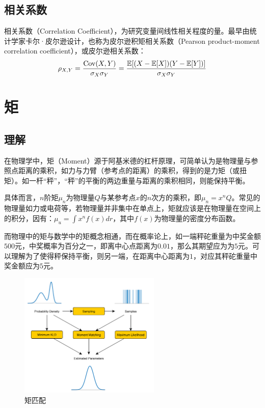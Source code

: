 \documentclass[11pt]{article}
\begin{document}
\subsection{相关系数}

相关系数（Correlation Coefficient），为研究变量间线性相关程度的量。最早由统计学家卡尔·皮尔逊设计，也称为皮尔逊积矩相关系数（Pearson product-moment correlation coefficient），或皮尔逊相关系数：
\begin{equation*}
    \rho_{X,Y} = \frac{\operatorname{Cov}(X,Y)}{\sigma_X\sigma_Y}
    = \frac{\mathbb{E}[(X-\mathbb{E}[X])(Y-\mathbb{E}[Y])]}{\sigma_X\sigma_Y}
\end{equation*}

\section{矩}

\subsection{理解}

在物理学中，矩（Moment）源于阿基米德的杠杆原理，可简单认为是物理量与参照点距离的乘积，如力与力臂（参考点的距离）的乘积，得到的是力矩（或扭矩）。如一杆“秤”，“秤”的平衡的两边重量与距离的乘积相同，则能保持平衡。

具体而言，$n$阶矩$\mu_n$为物理量$Q$与某参考点$x$的$n$次方的乘积，即$\mu_n = x^n Q$。常见的物理量如力或电荷等，若物理量并非集中在单点上，矩就应该是在物理量在空间上的积分，因有：$\mu_u = \int x^n f(x) dr$，其中$f(x)$为物理量的密度分布函数。

而物理中的矩与数学中的矩概念相通，而在概率论上，如一端秤砣重量为中奖金额$500$元，中奖概率为百分之一，即离中心点距离为$0.01$，那么其期望应为为$5$元。可以理解为了使得秤保持平衡，则另一端，在距离中心距离为$1$，对应其秤砣重量中奖金额应为$5$元。

\begin{figure}[H]
    \centering
    \includegraphics[width=0.6\textwidth]{fig/moment-matching.png}
    \caption{矩匹配}
    \label{fig:moment-match}
\end{figure}
\end{document}
